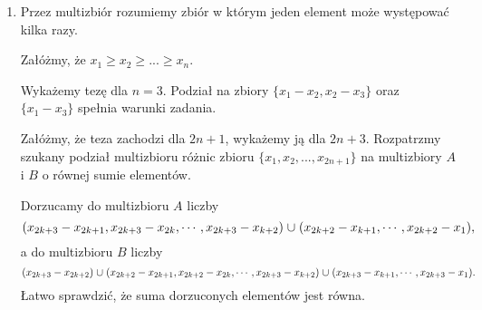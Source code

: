 \begin{enumerate}
	\item 
	Przez multizbiór rozumiemy zbiór w którym jeden element może występować kilka razy.

	Załóżmy, że $x_1 \geqslant x_2 \geqslant ... \geqslant x_n$. 

	Wykażemy tezę dla $n = 3$. Podział na zbiory $\{x_1 - x_2, x_2 - x_3\}$ oraz $\{x_1 - x_3\}$ spełnia warunki zadania.

	Załóżmy, że teza zachodzi dla $2n + 1$, wykażemy ją dla $2n + 3$.
	Rozpatrzmy szukany podział multizbioru różnic zbioru $\{x_1, x_2, ..., x_{2n + 1}\}$ na multizbiory $A$ i $B$ o równej sumie elementów.

	Dorzucamy do multizbioru $A$ liczby
	\[
		({x_{2k+3}-x_{2k+1},x_{2k+3}-x_{2k},\cdots,x_{2k+3}-x_{k+2}}) \thickspace {\cup}\thickspace ({x_{2k+2}-x_{k+1},\cdots,x_{2k+2}-x_1}),
	\]
	a do multizbioru $B$ liczby
	\[
		(x_{2k+3}-x_{2k+2})\thickspace {\cup}\thickspace ({x_{2k+2}-x_{2k+1},x_{2k+2}-x_{2k},\cdots,x_{2k+3}-x_{k+2}})\thickspace {\cup} \thickspace({x_{2k+3}-x_{k+1},\cdots,x_{2k+3}-x_1}).
	\]
	Łatwo sprawdzić, że suma dorzuconych elementów jest równa.
\end{enumerate}